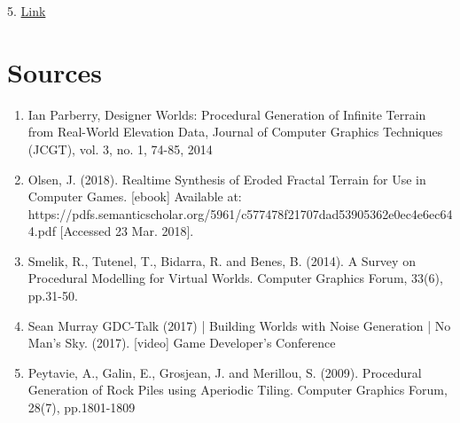 \documentclass[12pt]{article}
\begin{document}
5. \href{https://perso.liris.cnrs.fr/adrien.peytavie/publications/articles/PG2009_ProceduralGenerationOfRockPilesUsingAperiodicTiling.pdf}{Link}

\section{Sources}

\begin{enumerate}
    \item Ian Parberry, Designer Worlds: Procedural Generation of Infinite Terrain from Real-World Elevation Data, Journal of Computer Graphics Techniques (JCGT), vol. 3, no. 1, 74-85, 2014
    \item Olsen, J. (2018). Realtime Synthesis of Eroded Fractal Terrain for Use in Computer Games. [ebook] Available at: https://pdfs.semanticscholar.org/5961/c577478f21707dad53905362e0ec4e6ec644.pdf [Accessed 23 Mar. 2018]. 
    \item Smelik, R., Tutenel, T., Bidarra, R. and Benes, B. (2014). A Survey on Procedural Modelling for Virtual Worlds. Computer Graphics Forum, 33(6), pp.31-50.
    \item Sean Murray GDC-Talk (2017) | Building Worlds with Noise Generation | No Man's Sky. (2017). [video] Game Developer's Conference
    \item Peytavie, A., Galin, E., Grosjean, J. and Merillou, S. (2009). Procedural Generation of Rock Piles using Aperiodic Tiling. Computer Graphics Forum, 28(7), pp.1801-1809
\end{enumerate}
\end{document}
